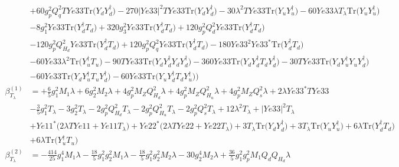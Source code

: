 \begin{align}
 &+60 g_{p}^{2} Q_{q}^{2} TYe33 \mbox{Tr}\Big({Y_d  Y_{d}^{\dagger}}\Big) -270 |Ye33|^2 TYe33 \mbox{Tr}\Big({Y_d  Y_{d}^{\dagger}}\Big) -30 \lambda^{2} TYe33 \mbox{Tr}\Big({Y_u  Y_{u}^{\dagger}}\Big) -60 Ye33 \lambda T_{\lambda} \mbox{Tr}\Big({Y_u  Y_{u}^{\dagger}}\Big) \nonumber \\ 
 &-8 g_{1}^{2} Ye33 \mbox{Tr}\Big({Y_{d}^{\dagger}  T_d}\Big) +320 g_{3}^{2} Ye33 \mbox{Tr}\Big({Y_{d}^{\dagger}  T_d}\Big) +120 g_{p}^{2} Q_{d}^{2} Ye33 \mbox{Tr}\Big({Y_{d}^{\dagger}  T_d}\Big) \nonumber \\ 
 &-120 g_{p}^{2} Q_{H_d}^{2} Ye33 \mbox{Tr}\Big({Y_{d}^{\dagger}  T_d}\Big) +120 g_{p}^{2} Q_{q}^{2} Ye33 \mbox{Tr}\Big({Y_{d}^{\dagger}  T_d}\Big) -180 Ye33^{2} Ye33^* \mbox{Tr}\Big({Y_{d}^{\dagger}  T_d}\Big) \nonumber \\ 
 &-60 Ye33 \lambda^{2} \mbox{Tr}\Big({Y_{u}^{\dagger}  T_u}\Big) -90 TYe33 \mbox{Tr}\Big({Y_d  Y_{d}^{\dagger}  Y_d  Y_{d}^{\dagger}}\Big) -360 Ye33 \mbox{Tr}\Big({Y_d  Y_{d}^{\dagger}  T_d  Y_{d}^{\dagger}}\Big) -30 TYe33 \mbox{Tr}\Big({Y_d  Y_{u}^{\dagger}  Y_u  Y_{d}^{\dagger}}\Big) \nonumber \\ 
 &-60 Ye33 \mbox{Tr}\Big({Y_d  Y_{u}^{\dagger}  T_u  Y_{d}^{\dagger}}\Big) -60 Ye33 \mbox{Tr}\Big({Y_u  Y_{d}^{\dagger}  T_d  Y_{u}^{\dagger}}\Big) \Big)\\ 
\beta_{T_{\lambda}}^{(1)} & =  
+\frac{6}{5} g_{1}^{2} M_1 \lambda +6 g_{2}^{2} M_2 \lambda +4 g_{p}^{2} M_Z Q_{H_d}^{2} \lambda +4 g_{p}^{2} M_Z Q_{H_u}^{2} \lambda +4 g_{p}^{2} M_Z Q_{s}^{2} \lambda +2 \lambda Ye33^* TYe33 \nonumber \\ 
 &-\frac{3}{5} g_{1}^{2} T_{\lambda} -3 g_{2}^{2} T_{\lambda} -2 g_{p}^{2} Q_{H_d}^{2} T_{\lambda} -2 g_{p}^{2} Q_{H_u}^{2} T_{\lambda} -2 g_{p}^{2} Q_{s}^{2} T_{\lambda} +12 \lambda^{2} T_{\lambda} +|Ye33|^2 T_{\lambda} \nonumber \\ 
 &+Ye11^* \Big(2 \lambda TYe11  + Ye11 T_{\lambda} \Big)+Ye22^* \Big(2 \lambda TYe22  + Ye22 T_{\lambda} \Big)+3 T_{\lambda} \mbox{Tr}\Big({Y_d  Y_{d}^{\dagger}}\Big) +3 T_{\lambda} \mbox{Tr}\Big({Y_u  Y_{u}^{\dagger}}\Big) +6 \lambda \mbox{Tr}\Big({Y_{d}^{\dagger}  T_d}\Big) \nonumber \\ 
 &+6 \lambda \mbox{Tr}\Big({Y_{u}^{\dagger}  T_u}\Big) \\ 
\beta_{T_{\lambda}}^{(2)} & =  
-\frac{414}{25} g_{1}^{4} M_1 \lambda -\frac{18}{5} g_{1}^{2} g_{2}^{2} M_1 \lambda -\frac{18}{5} g_{1}^{2} g_{2}^{2} M_2 \lambda -30 g_{2}^{4} M_2 \lambda +\frac{36}{5} g_{1}^{2} g_{p}^{2} M_1 Q_{d} Q_{H_d} \lambda \nonumber \\ 

\end{align}
